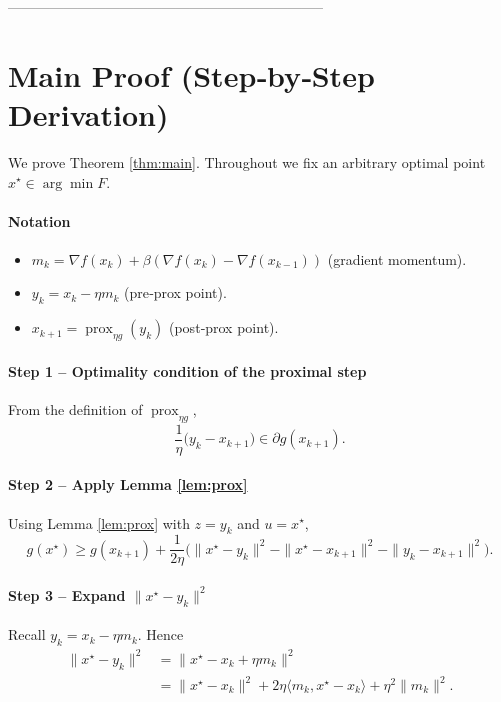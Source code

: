 \documentclass{article}
\newcommand{\prox}{\operatorname{prox}}
\newcommand{\inner}[2]{\langle #1,#2\rangle}
\newcommand{\norm}[1]{\|#1\|}
\begin{document}
--------------------------------------------------------------------

\section*{Main Proof (Step‑by‑Step Derivation)}
We prove Theorem \ref{thm:main}.  Throughout we fix an arbitrary optimal point $x^{\star}\in\arg\min F$.

\paragraph{Notation}
\begin{itemize}
    \item $m_{k}= \nabla f(x_{k})+\beta(\nabla f(x_{k})-\nabla f(x_{k-1}))$ (gradient momentum).
    \item $y_{k}=x_{k}-\eta m_{k}$ (pre‑prox point).
    \item $x_{k+1}= \prox_{\eta g}(y_{k})$ (post‑prox point).
\end{itemize}

\paragraph{Step 1 – Optimality condition of the proximal step}
From the definition of $\prox_{\eta g}$,
\[
\frac{1}{\eta}\bigl(y_{k}-x_{k+1}\bigr)\in\partial g(x_{k+1}).
\tag{S1}
\]

\paragraph{Step 2 – Apply Lemma \ref{lem:prox}}
Using Lemma \ref{lem:prox} with $z=y_{k}$ and $u=x^{\star}$,
\[
g(x^{\star})\ge g(x_{k+1})+\frac1{2\eta}
\bigl(\norm{x^{\star}-y_{k}}^{2}-\norm{x^{\star}-x_{k+1}}^{2}
-\norm{y_{k}-x_{k+1}}^{2}\bigr).
\tag{S2}
\]

\paragraph{Step 3 – Expand $\norm{x^{\star}-y_{k}}^{2}$}
Recall $y_{k}=x_{k}-\eta m_{k}$.  Hence
\begin{align}
\norm{x^{\star}-y_{k}}^{2}
&= \norm{x^{\star}-x_{k}+\eta m_{k}}^{2} \nonumber\\
&= \norm{x^{\star}-x_{k}}^{2}+2\eta\inner{m_{k}}{x^{\star}-x_{k}}
+\eta^{2}\norm{m_{k}}^{2}.
\tag{S3}
\end{align}
\end{document}
